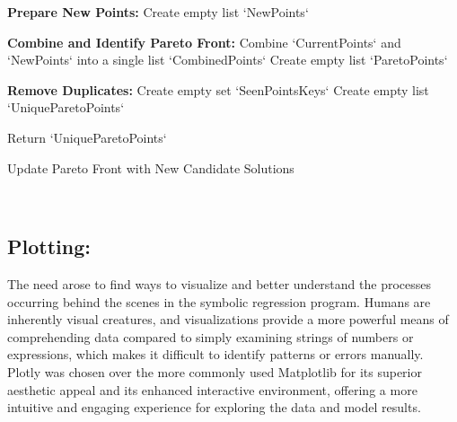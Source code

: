 \documentclass{article}
\begin{document}
\begin{algorithm}[H]
\SetAlgoLined %

\textbf{Prepare New Points:}\;
Create empty list `NewPoints`\;

\textbf{Combine and Identify Pareto Front:}\;
Combine `CurrentPoints` and `NewPoints` into a single list `CombinedPoints`\;
Create empty list `ParetoPoints`\;

\textbf{Remove Duplicates:}\;
Create empty set `SeenPointsKeys`\;
Create empty list `UniqueParetoPoints`\;

Return `UniqueParetoPoints`\;

\caption{Update Pareto Front with New Candidate Solutions}
\label{alg:update_pareto_points} %
\end{algorithm}\\



\subsection{Plotting: }


The need arose to find ways to visualize and better understand the processes occurring behind the scenes in the symbolic regression program. Humans are inherently visual creatures, and visualizations provide a more powerful means of comprehending data compared to simply examining strings of numbers or expressions, which makes it difficult to identify patterns or errors manually. Plotly was chosen over the more commonly used Matplotlib for its superior aesthetic appeal and its enhanced interactive environment, offering a more intuitive and engaging experience for exploring the data and model results.\\
\end{document}
